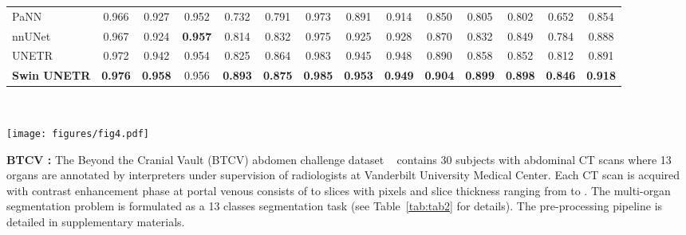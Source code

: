 \documentclass[10pt,twocolumn,letterpaper]{article}
\begin{document}
\begin{table*}[t]
{\begin{tabular}{l|cccccccccccc|c}
\\ 
PaNN~\cite{zhou2019prior}     
& 0.966 & 0.927                       
& 0.952 & 0.732                        
& 0.791 & 0.973                        
& 0.891 & 0.914   
& 0.850 & 0.805
& 0.802 & 0.652
& 0.854
\\
nnUNet~\cite{isensee2021nnu}     
& 0.967 & 0.924                        
& \textbf{0.957} & 0.814                        
& 0.832 & 0.975                        
& 0.925 & 0.928   
& 0.870 & 0.832
& 0.849 & 0.784
& 0.888
\\
UNETR~\cite{hatamizadeh2021unetr}
& 0.972 & 0.942                        
& 0.954 & 0.825                        
& 0.864 & 0.983                        
& 0.945 & 0.948   
& 0.890 & 0.858
& 0.852 & 0.812
& 0.891
\\
\textbf{Swin UNETR}     
& \textbf{0.976} & \textbf{0.958}                        
& 0.956 & \textbf{0.893}                        
& \textbf{0.875} & \textbf{0.985}                        
& \textbf{0.953} & \textbf{0.949}   
& \textbf{0.904} & \textbf{0.899}
& \textbf{0.898} & \textbf{0.846}
& \textbf{0.918}
\\ \hline
\end{tabular}}
\\
\caption[caption]{Leaderboard\footnotemark Dice results of BTCV challenge on multi-organ segmentation. The proposed method achieves state-of-the-art performance in both free and standard competitions. Note: Spl: spleen, RKid: right kidney, LKid: left kidney, Gall: gallbladder, Eso: esophagus, Liv: liver, Sto: stomach, Aor: aorta, IVC: inferior vena cava, Veins: portal and splenic veins, Pan: pancreas, AG: left and right adrenal glands.}
\label{tab:tab2}
\end{table*}

\begin{figure*}[t]
\centering
\texttt{[image: figures/fig4.pdf]}
\caption{Qualitative visualizations of the proposed Swin UNETR and baseline methods. Three representative subjects are demonstrated. Regions of evident improvements are enlarged to show better details of pancreas (blue), portal vein (light green), and adrenal gland (red).}
  \label{fig:fig4}
\end{figure*}

\textbf{BTCV :} The Beyond the Cranial Vault (BTCV) abdomen challenge dataset ~\cite{landman2015miccai} contains 30 subjects with abdominal CT scans where 13 organs are annotated by interpreters under supervision of radiologists at Vanderbilt University Medical Center. Each CT scan is acquired with contrast enhancement phase at portal venous consists of  to  slices with  pixels and slice thickness ranging from  to  . The multi-organ segmentation problem is formulated as a 13 classes segmentation task (see Table~\ref{tab:tab2} for details). The pre-processing pipeline is detailed in supplementary materials. 
\end{document}
